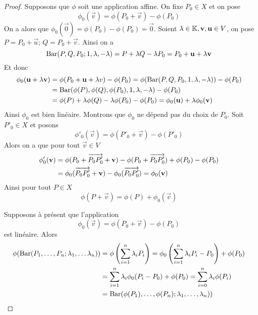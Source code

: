 \begin{proof}
	Supposons que $\phi$ soit une application affine. On fixe $P_0 \in X$ et on pose
	\begin{equation*}
		\phi_0(\vec{v}) = \phi(P_0 + \vec{v}) - \phi(P_0)
	\end{equation*}
	On a alors que $\phi_0(\vec{0}) = \phi(P_0) - \phi(P_0) = \vec{0}$. Soient
	$\lambda \in \mathbb{K}, \mathbf{v}, \mathbf{u} \in V$, on pose
	$P = P_0 + \vec{u}\textrm{; } Q = P_0 + \vec{v}$.
	Ainsi on a
	\begin{equation*}
		\operatorname{Bar}(P, Q, P_0; 1, \lambda, -\lambda) = P + \lambda Q  -
		\lambda P_0  = P_0 + \mathbf{u} + \lambda \mathbf{v}
	\end{equation*}
	Et donc
	\begin{align*}
		\phi_0(\mathbf{u} + \lambda \mathbf{v}) &= \phi(P_0 + \mathbf{u} + \lambda{v})
		- \phi(P_0) = \phi(\operatorname{Bar}(P, Q, P_0, 1, \lambda, -\lambda)) - \phi(P_0) \\
      &= \operatorname{Bar}(\phi(P), \phi(Q), \phi(P_0), 1, \lambda, -\lambda) 
		- \phi(P_0)\\
		&= \phi(P) + \lambda \phi(Q) - \lambda \phi(P_0) - \phi(P_0)
		= \phi_0(\mathbf{u}) + \lambda\phi_0(\mathbf{v})
	\end{align*}
	Ainsi $\phi_0$ est bien linéaire. Montrons que $\phi_0$ ne dépend pas du
	choix de $P_0$. Soit $P'_0 \in X$ et posons
	\begin{equation*}
		\phi'_0(\vec{v}) = \phi(P'_0 + \vec{v}) - \phi(P'_0)
	\end{equation*}
	Alors on a que pour tout $\vec{v} \in V$
	\begin{align*}
		\phi'_0(\mathbf{v}) &= \phi(P_0 + \overrightarrow{P_0 P'_0} + \mathbf{v})
		- \phi(P_0 + \overrightarrow{P_0 P'_0}) + \phi(P_0) - \phi(P_0) \\
		&= \phi_0(\overrightarrow{P_0 P'_0} + \mathbf{v}) - \phi_0(\overrightarrow{P_0 P'_0})
		= \phi_0(\mathbf{v})
	\end{align*}
	Ainsi pour tout $P \in X$
	\begin{equation*}
		\phi(P + \vec{v}) = \phi(P) + \phi_0(\vec{v})
	\end{equation*}

	Supposons à présent que l'application
	\begin{equation*}
		\phi_0(\vec{v}) = \phi(P_0 + \vec{v}) - \phi(P_0)
	\end{equation*}
	est linéaire. Alors
	\begin{align*}
		\phi(\operatorname{Bar}(P_1, \dots, P_n; \lambda_1, \dots \lambda_n))
		&= \phi\left(\sum_{i=1}^n \lambda_i P_i\right)
		= \phi_0\left(\sum_{i=1}^n \lambda_i P_i - P_0\right) + \phi(P_0)\\
		&= \sum_{i=1}^n \lambda_i \phi_0(P_i - P_0) + \phi(P_0)
		= \sum_{i=0}^n \lambda_i \phi(P_i) \\
		&= \operatorname{Bar}(\phi(P_1), \dots, \phi(P_n); \lambda_1, \dots, \lambda_n))
	\end{align*}
\end{proof}

